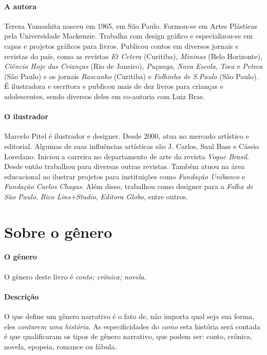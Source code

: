 \documentclass[11pt]{extarticle}
\begin{document}
\paragraph{A autora} Tereza Yamashita nasceu em 1965, em São Paulo. Formou-se em Artes Plásticas pela Universidade Mackenzie. Trabalha com design gráfico e especializou-se em capas e projetos gráficos para livros. Publicou contos em diversos jornais e revistas do país, como as revistas \textit{Et Cetera} (Curitiba), \textit{Mininas} (Belo Horizonte), \textit{Ciência Hoje das Crianças} (Rio de Janeiro), \textit{Puçanga}, \textit{Nova Escola}, \textit{Toca} e \textit{Peteca} (São Paulo) e os jornais \textit{Rascunho} (Curitiba) e \textit{Folhinha de S.Paulo} (São Paulo). É ilustradora e escritora e publicou mais de dez livros para crianças e adolescentes, sendo diversos deles em co-autoria com Luiz Bras.

\paragraph{O ilustrador} Marcelo Pitel é ilustrador e designer. Desde 2000, atua no mercado artístico e editorial. Algumas de suas influências artísticas são J. Carlos, Saul Bass e Cássio Loredano. Iniciou a carreira no departamento de arte da revista \textit{Vogue Brasil}. Desde então trabalhou para diversas outras revistas. Também atuou na área educacional ao ilustrar projetos para instituições como \textit{Fundação Unibanco} e \textit{Fundação Carlos Chagas}. Além disso, trabalhou como designer para a \textit{Folha de São Paulo}, \textit{Rico Lins+Studio}, \textit{Editora Globo}, entre outros.


\section{Sobre o gênero}

\paragraph{O gênero} O gênero deste livro é \textit{conto; crônica; novela}.

\paragraph{Descrição} O que define um gênero narrativo é o fato de, não importa
qual seja sua forma, eles \textit{contarem uma história}.
As especificidades do \textit{como} esta história será contada é que
qualificaram os tipos de gênero narrativo, que podem ser: conto, crônica, novela,
epopeia, romance ou fábula. 
\end{document}
